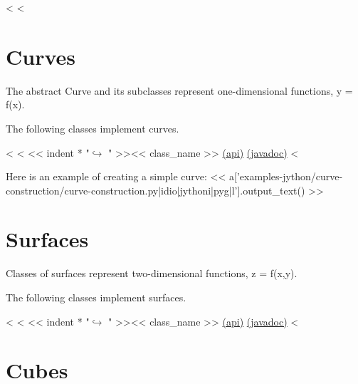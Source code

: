 <%
<%

\section{Curves}

The abstract Curve and its subclasses represent one-dimensional functions, y = f(x).

The following classes implement curves.

\begin{fullwidth}
<%
<%
<< indent * "$\hookrightarrow$ " >><< class_name >> \href{http://docs-static.opengamma.com/<< OG_VERSION >>/analytics/api/<< package_name >>.html#class-<<class_name>>}{(api)} \href{http://docs-static.opengamma.com/<< OG_VERSION >>/java/javadocs/<< class_name.replace(".","/") >>.html}{(javadoc)}
<%
\end{fullwidth}

Here is an example of creating a simple curve:
<< a['examples-jython/curve-construction/curve-construction.py|idio|jythoni|pyg|l'].output_text() >>

\section{Surfaces}

Classes of surfaces represent two-dimensional functions, z = f(x,y).

The following classes implement surfaces.

\begin{fullwidth}
<%
<%
<< indent * "$\hookrightarrow$ " >><< class_name >> \href{http://docs-static.opengamma.com/<< OG_VERSION >>/analytics/api/<< package_name >>.html#class-<<class_name>>}{(api)} \href{http://docs-static.opengamma.com/<< OG_VERSION >>/java/javadocs/<< class_name.replace(".","/") >>.html}{(javadoc)}
<%
\end{fullwidth}

\section{Cubes}

